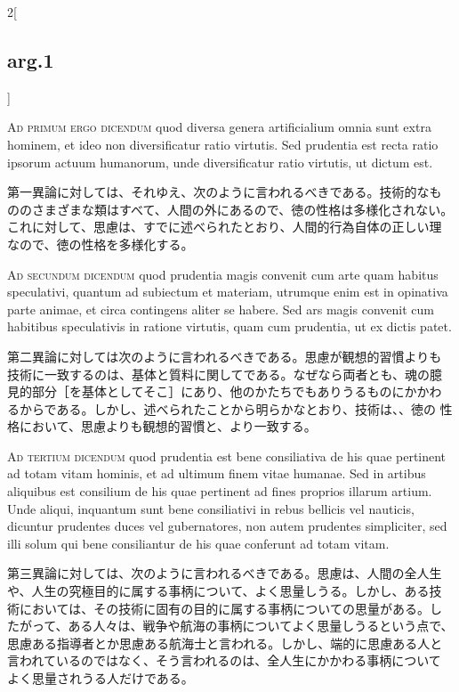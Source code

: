 \documentclass[paper=a4paper,fontsize=10pt,jafontsize=9pt,titlepage]{jlreq}
\begin{document}
\begin{paracol}{2}[\subsection{arg.1}]
\switchcolumn*[\subsection{ad.1}]

{\scshape Ad primum ergo dicendum} quod diversa genera artificialium
 omnia sunt extra hominem, et ideo non diversificatur ratio
 virtutis. Sed prudentia est recta ratio ipsorum actuum humanorum,
 unde diversificatur ratio virtutis, ut dictum est.

\switchcolumn

第一異論に対しては、それゆえ、次のように言われるべきである。技術的なも
ののさまざまな類はすべて、人間の外にあるので、徳の性格は多様化されない。
これに対して、思慮は、すでに述べられたとおり、人間的行為自体の正しい理
なので、徳の性格を多様化する。

\switchcolumn*[\subsection{ad.2}]

{\scshape Ad secundum dicendum} quod prudentia magis convenit cum arte
 quam habitus speculativi, quantum ad subiectum et materiam, utrumque
 enim est in opinativa parte animae, et circa contingens aliter se
 habere. Sed ars magis convenit cum habitibus speculativis in ratione
 virtutis, quam cum prudentia, ut ex dictis patet.

\switchcolumn

第二異論に対しては次のように言われるべきである。思慮が観想的習慣よりも
技術に一致するのは、基体と質料に関してである。なぜなら両者とも、魂の臆
見的部分［を基体としてそこ］にあり、他のかたちでもありうるものにかかわ
るからである。しかし、述べられたことから明らかなとおり、技術は、、徳の
性格において、思慮よりも観想的習慣と、より一致する。

\switchcolumn*[\subsection{ad.3}]

{\scshape Ad tertium dicendum} quod prudentia est bene consiliativa de
his quae pertinent ad totam vitam hominis, et ad ultimum finem vitae
humanae. Sed in artibus aliquibus est consilium de his quae pertinent
ad fines proprios illarum artium. Unde aliqui, inquantum sunt bene
consiliativi in rebus bellicis vel nauticis, dicuntur prudentes duces
vel gubernatores, non autem prudentes simpliciter, sed illi solum qui
bene consiliantur de his quae conferunt ad totam vitam.

\switchcolumn

第三異論に対しては、次のように言われるべきである。思慮は、人間の全人生
や、人生の究極目的に属する事柄について、よく思量しうる。しかし、ある技
術においては、その技術に固有の目的に属する事柄についての思量がある。し
たがって、ある人々は、戦争や航海の事柄についてよく思量しうるという点で、
思慮ある指導者とか思慮ある航海士と言われる。しかし、端的に思慮ある人と
言われているのではなく、そう言われるのは、全人生にかかわる事柄について
よく思量されうる人だけである。

\end{paracol}
\newpage
\end{document}
